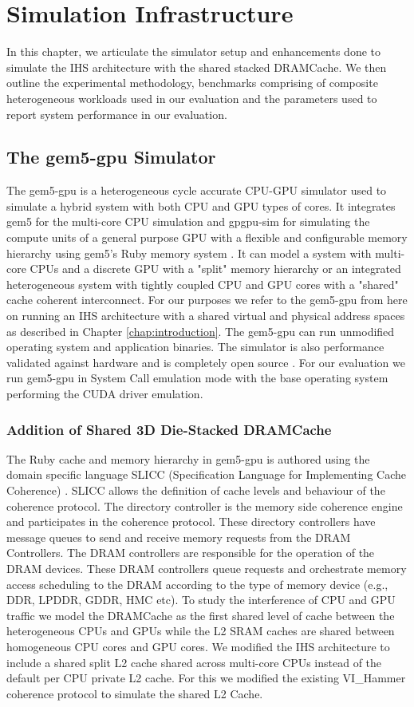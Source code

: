 \chapter{Simulation Infrastructure} \label{chap:simulator}
In this chapter, we articulate the simulator setup and enhancements done to simulate the IHS architecture with the shared stacked DRAMCache. We then outline the experimental methodology, benchmarks comprising of composite heterogeneous workloads used in our evaluation and the parameters used to report system performance in our evaluation.

\section{The gem5-gpu Simulator} \label{gem5-gpu-simulator}
The gem5-gpu \cite{gem5-gpu} is a heterogeneous cycle accurate CPU-GPU simulator used to simulate a hybrid system with both CPU and GPU types of cores. It integrates gem5 \cite{gem5} for the multi-core CPU simulation and gpgpu-sim \cite{gpgpu-sim} for simulating the compute units of a general purpose GPU with a flexible and configurable memory hierarchy using gem5's Ruby memory system \cite{gems}. It can model a system with multi-core CPUs and a discrete GPU with a "split" memory hierarchy or an integrated heterogeneous system with tightly coupled CPU and GPU cores with a "shared" cache coherent interconnect. For our purposes we refer to the gem5-gpu from here on running an IHS architecture with a shared virtual and physical address spaces as described in Chapter \ref{chap:introduction}. The gem5-gpu can run unmodified operating system and application binaries. The simulator is also performance validated against hardware and is completely open source \cite{gem5-gpu}. For our evaluation we run gem5-gpu in System Call emulation mode with the base operating system performing the CUDA driver emulation.

\subsection{Addition of Shared 3D Die-Stacked DRAMCache}
The Ruby cache and memory hierarchy in gem5-gpu is authored using the domain specific language SLICC (Specification Language for Implementing Cache Coherence) \cite{gems}. SLICC allows the definition of cache levels and behaviour of the coherence protocol. The directory controller is the memory side coherence engine and participates in the coherence protocol. These directory controllers have message queues to send and receive memory requests from the DRAM Controllers. The DRAM controllers are responsible for the operation of the DRAM devices. These DRAM controllers queue requests and orchestrate memory access scheduling to the DRAM according to the type of memory device (e.g., DDR, LPDDR, GDDR, HMC etc). To study the interference of CPU and GPU traffic we model the DRAMCache as the first shared level of cache between the heterogeneous CPUs and GPUs while the L2 SRAM caches are shared between homogeneous CPU cores and GPU cores. We modified the IHS architecture to include a shared split L2 cache shared across multi-core CPUs instead of the default per CPU private L2 cache. For this we modified the existing VI\_Hammer coherence protocol \cite{gem5-gpu} to simulate the shared L2 Cache.
